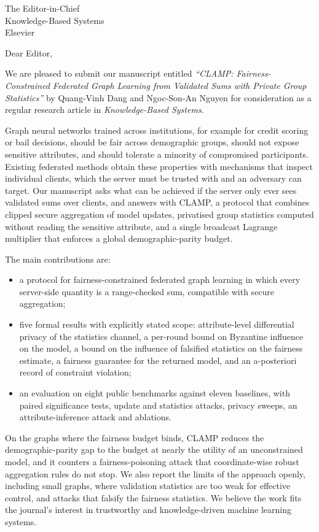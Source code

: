 \documentclass[11pt]{letter}
\date{15 October 2026}
\begin{document}
\begin{letter}{The Editor-in-Chief\\Knowledge-Based Systems\\Elsevier}

\opening{Dear Editor,}

We are pleased to submit our manuscript entitled \emph{``CLAMP: Fairness-Constrained Federated Graph Learning from Validated Sums with Private Group Statistics''} by Quang-Vinh Dang and Ngoc-Son-An Nguyen for consideration as a regular research article in \emph{Knowledge-Based Systems}.

Graph neural networks trained across institutions, for example for credit scoring or bail decisions, should be fair across demographic groups, should not expose sensitive attributes, and should tolerate a minority of compromised participants. Existing federated methods obtain these properties with mechanisms that inspect individual clients, which the server must be trusted with and an adversary can target. Our manuscript asks what can be achieved if the server only ever sees validated sums over clients, and answers with CLAMP, a protocol that combines clipped secure aggregation of model updates, privatised group statistics computed without reading the sensitive attribute, and a single broadcast Lagrange multiplier that enforces a global demographic-parity budget.

The main contributions are:
\begin{itemize}
\item a protocol for fairness-constrained federated graph learning in which every server-side quantity is a range-checked sum, compatible with secure aggregation;
\item five formal results with explicitly stated scope: attribute-level differential privacy of the statistics channel, a per-round bound on Byzantine influence on the model, a bound on the influence of falsified statistics on the fairness estimate, a fairness guarantee for the returned model, and an a-posteriori record of constraint violation;
\item an evaluation on eight public benchmarks against eleven baselines, with paired significance tests, update and statistics attacks, privacy sweeps, an attribute-inference attack and ablations.
\end{itemize}

On the graphs where the fairness budget binds, CLAMP reduces the demographic-parity gap to the budget at nearly the utility of an unconstrained model, and it counters a fairness-poisoning attack that coordinate-wise robust aggregation rules do not stop. We also report the limits of the approach openly, including small graphs, where validation statistics are too weak for effective control, and attacks that falsify the fairness statistics. We believe the work fits the journal's interest in trustworthy and knowledge-driven machine learning systems.


\end{letter}
\end{document}
